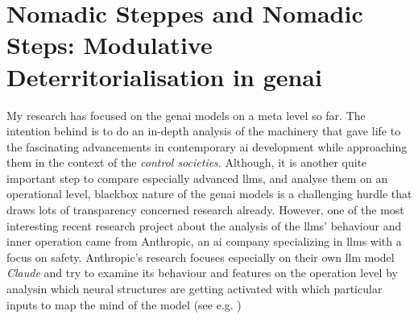 \section{Nomadic Steppes and Nomadic Steps: Modulative Deterritorialisation in
  \Gls{genai} }


My research has focused on the \gls{genai} models on a meta level so far. The
intention behind is to do an in-depth analysis of the machinery that gave life
to the fascinating advancements in contemporary \gls{ai} development while
approaching them in the context of the \textit{control societies}. Although, it
is another quite important step to compare especially advanced \glspl{llm}, and
analyse them on an operational level, blackbox nature of the \gls{genai} models
is a challenging hurdle that draws lots of transparency concerned research
already. However, one of the most interesting recent research project about the
analysis of the \glspl{llm}' behaviour and inner operation came from
Anthropic,
an \gls{ai} company specializing in \glspl{llm} with a focus on safety.
Anthropic's research focuses especially on their own \gls{llm} model \textit{Claude} and try to examine its behaviour and features on the operation level by analysin which neural structures are getting activated with which particular inputs to map the mind of the model (see e.g. \cite[]{templeton2024, lindsey2024, ameisen2025})

